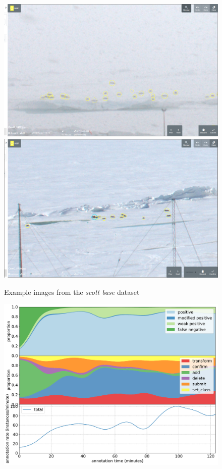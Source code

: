 \begin{figure}[!h]
\centering
  \includegraphics[width=0.475\linewidth]{figures/annotation/screenshots/scott_base_storm.png}
  \hfill
  \includegraphics[width=0.45\linewidth]{figures/annotation/screenshots/scott_base_sunny.png}
  \caption{}
\caption{ Example images from the \emph{scott base} dataset}
\label {fig:scott_base_examples}
\end{figure}

\begin{figure}[!h]
\centering
\includegraphics[width=1.0\linewidth]{charts/action_annotations/scott_base.pdf}
\caption{  }
\label{fig:scott_base_annotation}
\end{figure}